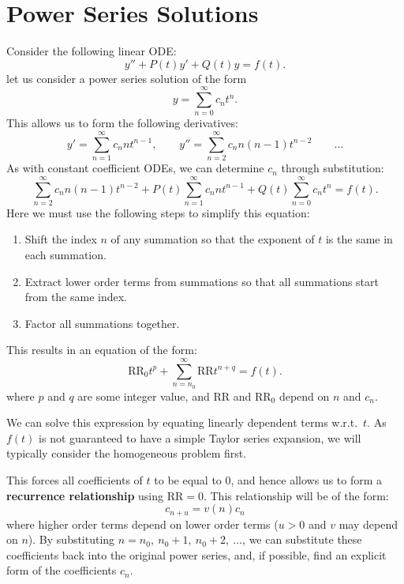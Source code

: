 \documentclass{article}
\begin{document}
\section{Power Series Solutions}
Consider the following linear ODE:
\begin{equation*}
    y'' + P\left( t \right) y' + Q\left( t \right) y = f\left( t \right).
\end{equation*}
let us consider a power series solution of the form
\begin{equation*}
    y = \sum_{n = 0}^\infty c_n t^n.
\end{equation*}
This allows us to form the following derivatives:
\begin{equation*}
    y' = \sum_{n = 1}^\infty c_n n t^{n - 1}, \qquad y'' = \sum_{n = 2}^\infty c_n n \left( n - 1 \right) t^{n - 2} \qquad \dots
\end{equation*}
As with constant coefficient ODEs, we can determine \(c_n\) through substitution:
\begin{equation*}
    \sum_{n = 2}^\infty c_n n \left( n - 1 \right) t^{n - 2} + P\left( t \right) \sum_{n = 1}^\infty c_n n t^{n - 1} + Q\left( t \right) \sum_{n = 0}^\infty c_n t^n = f\left( t \right).
\end{equation*}
Here we must use the following steps to simplify this equation:
\begin{enumerate}
    \item Shift the index \(n\) of any summation so that the exponent of \(t\) is the same in each summation.
    \item Extract lower order terms from summations so that all summations start from the same index.
    \item Factor all summations together.
\end{enumerate}
This results in an equation of the form:
\begin{equation*}
    \mathrm{RR}_0 t^p + \sum_{n = n_0}^\infty \mathrm{RR} t^{n + q} = f\left( t \right).
\end{equation*}
where \(p\) and \(q\) are some integer value, and \(\mathrm{RR}\) and \(\mathrm{RR}_0\) depend on \(n\) and \(c_n\).

We can solve this expression by equating linearly dependent terms w.r.t.\ \(t\). As \(f\left( t \right)\)
is not guaranteed to have a simple Taylor series expansion, we will typically consider the homogeneous problem first.

This forces all coefficients of \(t\) to be equal to 0, and hence allows us to form a
\textbf{recurrence relationship} using \(\mathrm{RR} = 0\).
This relationship will be of the form:
\begin{equation*}
    c_{n + u} = v\left( n \right) c_n
\end{equation*}
where higher order terms depend on lower order terms (\(u > 0\) and \(v\) may depend on \(n\)). By substituting \(n = n_0,\: n_0 + 1,\: n_0 + 2,\: \ldots\), we
can substitute these coefficients back into the original power series, and, if possible, find an explicit form of the
coefficients \(c_n\).
\end{document}
